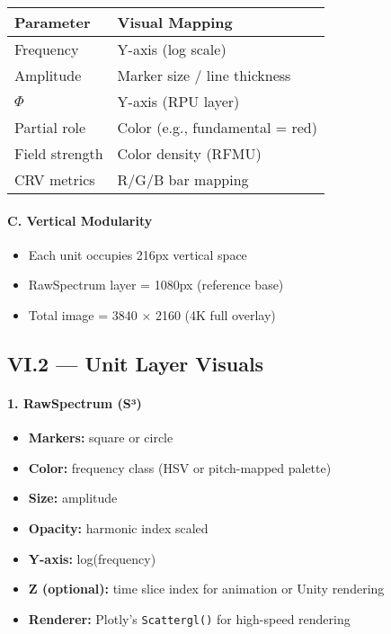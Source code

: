 \documentclass{article}
\begin{document}
\begin{center}
\begin{tabular}{|l|l|}
\hline
\textbf{Parameter} & \textbf{Visual Mapping} \\
\hline
Frequency & Y-axis (log scale) \\
Amplitude & Marker size / line thickness \\
$\Phi$ & Y-axis (RPU layer) \\
Partial role & Color (e.g., fundamental = red) \\
Field strength & Color density (RFMU) \\
CRV metrics & R/G/B bar mapping \\
\hline
\end{tabular}
\end{center}

\paragraph{C. Vertical Modularity}

\begin{itemize}
    \item Each unit occupies 216px vertical space
    \item RawSpectrum layer = 1080px (reference base)
    \item Total image = 3840 × 2160 (4K full overlay)
\end{itemize}

\subsection*{VI.2 — Unit Layer Visuals}

\paragraph{1. RawSpectrum (S³)}

\begin{itemize}
    \item \textbf{Markers:} square or circle
    \item \textbf{Color:} frequency class (HSV or pitch-mapped palette)
    \item \textbf{Size:} amplitude
    \item \textbf{Opacity:} harmonic index scaled
    \item \textbf{Y-axis:} log(frequency)
    \item \textbf{Z (optional):} time slice index for animation or Unity rendering
    \item \textbf{Renderer:} Plotly’s \texttt{Scattergl()} for high-speed rendering
\end{itemize}
\end{document}
